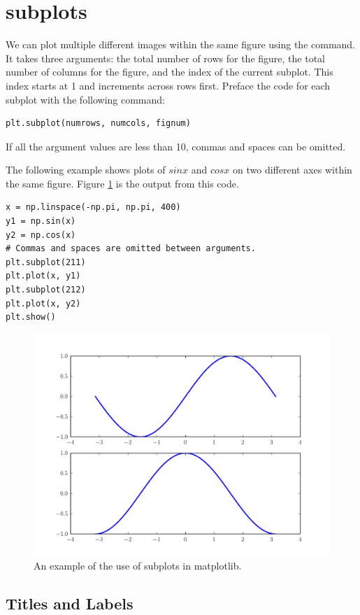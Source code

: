 \section*{subplots}

We can plot multiple different images within the same figure using the  command.
It takes three arguments: the total number of rows for the figure, the total number of columns for the figure, and the index of the current subplot.
This index starts at 1 and increments across rows first.
Preface the code for each subplot with the following command:
\begin{lstlisting}
plt.subplot(numrows, numcols, fignum)
\end{lstlisting}
If all the argument values are less than 10, commas and spaces can be omitted.

The following example shows plots of $sin x$ and $cos x$ on two different axes within the same figure.
Figure \ref{fig:subplots} is the output from this code.
\begin{lstlisting}
x = np.linspace(-np.pi, np.pi, 400)
y1 = np.sin(x)
y2 = np.cos(x)
# Commas and spaces are omitted between arguments.
plt.subplot(211)
plt.plot(x, y1)
plt.subplot(212)
plt.plot(x, y2)
plt.show()
\end{lstlisting}

\begin{figure}
\includegraphics[width=\textwidth]{subplots.pdf}
\caption{An example of the use of subplots in matplotlib.}
\label{fig:subplots}
\end{figure}

\subsection*{Titles and Labels}


